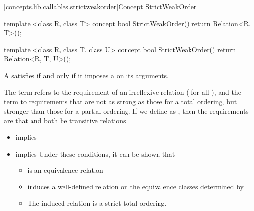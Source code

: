 \begin{addedblock}
[concepts.lib.callables.strictweakorder]{Concept StrictWeakOrder}

%
\begin{itemdecl}
template <class R, class T>
concept bool StrictWeakOrder() {
  return Relation<R, T>();
}

template <class R, class T, class U>
concept bool StrictWeakOrder() {
  return Relation<R, T, U>();
}
\end{itemdecl}

\begin{itemdescr}
\pnum
A  satisfies  if and only if
it imposes a  on its arguments.


{\color{black}
\pnum
The term
refers to the
requirement of an irreflexive relation ( for all ),
and the term
to requirements that are not as strong as
those for a total ordering,
but stronger than those for a partial
ordering.
If we define
as
,
then the requirements are that
and
both be transitive  relations:

\begin{itemize}
\item
{}
implies
\item
{}
implies
\enternote
Under these conditions, it can be shown that
\begin{itemize}
\item
{}
is an equivalence relation
\item
{}
induces a well-defined relation on the equivalence
classes determined by
\item
The induced relation is a strict total ordering.
\exitnote
\end{itemize}
\end{itemize}
}
\end{itemdescr}
\end{addedblock}
